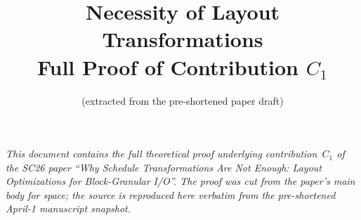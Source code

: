 \documentclass[11pt]{article}
\title{Necessity of Layout Transformations\\
  \large Full Proof of Contribution $C_1$}
\author{(extracted from the pre-shortened paper draft)}
\date{}
\theoremstyle{definition}
\theoremstyle{remark}
\begin{document}
\maketitle

\noindent\textit{This document contains the full theoretical proof
underlying contribution~$C_1$ of the SC26 paper ``Why Schedule
Transformations Are Not Enough: Layout Optimizations for
Block-Granular I/O''. The proof was cut from the paper's main body for
space; the source is reproduced here verbatim from the pre-shortened
April-1 manuscript snapshot.}

\bigskip





\end{document}
